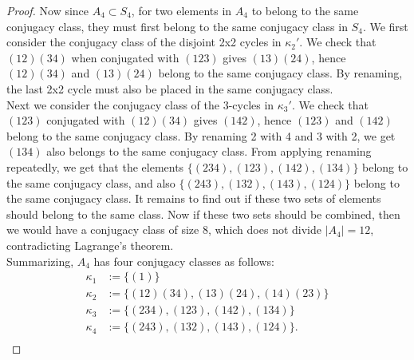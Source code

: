 \begin{enumerate}
\begin{proof}
      Now since $A_4\subset S_4$, for two elements in $A_4$ to belong to
      the same conjugacy class, they must first belong to the same
      conjugacy class in $S_4$. We first consider the conjugacy class of
      the disjoint 2x2 cycles in $\kappa_2'$. We check that $(12)(34)$ when
      conjugated with $(123)$ gives $(13)(24)$, hence $(12)(34)$ and
      $(13)(24)$ belong to the same conjugacy class. By renaming, the
      last 2x2 cycle must also be placed in the same conjugacy
      class. \\

      Next we consider the conjugacy class of the 3-cycles in $\kappa_3'$.
      We check that $(123)$ conjugated with $(12)(34)$ gives $(142)$, hence
      $(123)$ and $(142)$ belong to the same conjugacy class. By
      renaming 2 with 4 and 3 with 2, we get $(134)$ also belongs
      to the same conjugacy class. From applying renaming repeatedly, we
      get that the elements $\{(234),(123),(142),(134)\}$ belong to the
      same conjugacy class, and also $\{(243),(132),(143),(124)\}$ belong
      to the same conjugacy class. It remains to find out if these two sets
      of elements should belong to the same class. Now if these two sets
      should be combined, then we would have a conjugacy class of size 8,
      which does not divide $|A_4|=12$, contradicting Lagrange's theorem.
      \\

      Summarizing, $A_4$ has four conjugacy classes as follows:
      \begin{align*}
        \kappa_1 &:= \{(1)\} \\
        \kappa_2 &:= \{(12)(34),(13)(24),(14)(23)\} \\
        \kappa_3 &:= \{(234),(123),(142),(134)\} \\
        \kappa_4 &:= \{(243),(132),(143),(124)\}. \\
      \end{align*}
    \end{proof}
\end{enumerate}
